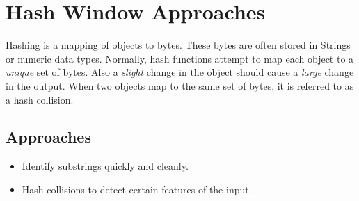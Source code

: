 \section{Hash Window Approaches}
Hashing is a mapping of objects to bytes.
These bytes are often stored in Strings or numeric data types.
Normally, hash functions attempt to map each object to a \textit{unique} set of bytes.
Also a \textit{slight} change in the object should cause a \textit{large} change in the output.
When two objects map to the same set of bytes, it is referred to as a hash collision.

\subsection{Approaches}
\begin{itemize}
	\item Identify substrings quickly and cleanly.
	\item Hash collisions to detect certain features of the input.
\end{itemize}
